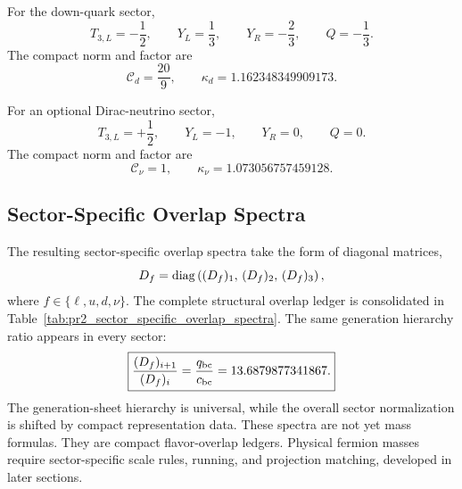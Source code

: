 \documentclass[11pt]{article}
\begin{document}
For the down-quark sector,
\begin{equation}
\boxed{
T_{3,L}=-\frac12,
\qquad
Y_L=\frac13,
\qquad
Y_R=-\frac23,
\qquad
Q=-\frac13.
}
\end{equation}
The compact norm and factor are
\begin{equation}
\boxed{
\mathcal C_d
=
\frac{20}{9},
\qquad
\kappa_d
=
1.162348349909173.
}
\end{equation}

For an optional Dirac-neutrino sector,
\begin{equation}
\boxed{
T_{3,L}=+\frac12,
\qquad
Y_L=-1,
\qquad
Y_R=0,
\qquad
Q=0.
}
\end{equation}
The compact norm and factor are
\begin{equation}
\boxed{
\mathcal C_\nu=1,
\qquad
\kappa_\nu
=
1.073056757459128.
}
\end{equation}

\subsection{Sector-Specific Overlap Spectra}
\label{sec:pr2_sector_specific_overlap_spectra}

The resulting sector-specific overlap spectra take the form of diagonal matrices,
\begin{equation}
D_f = {\rm diag}\left( (D_f)_1,\, (D_f)_2,\, (D_f)_3 \right),
\end{equation}
where \(f \in \{\ell, u, d, \nu\}\). The complete structural overlap ledger is consolidated in Table~\ref{tab:pr2_sector_specific_overlap_spectra}. The same generation hierarchy ratio appears in every sector:
\begin{equation}
\boxed{
\frac{(D_f)_{i+1}}{(D_f)_i}
=
\frac{q_{\rm bc}}{c_{\rm bc}}
=
13.6879877341867.
}
\end{equation}
 The generation-sheet hierarchy is universal, while the overall sector normalization is shifted by compact representation data. These spectra are not yet mass formulas. They are compact flavor-overlap ledgers. Physical fermion masses require sector-specific scale rules, running, and projection matching, developed in later sections.
\end{document}
